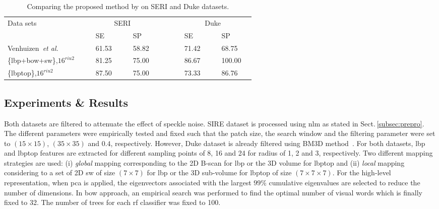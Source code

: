 \begin{tiny}
\begin{table}[t]
\caption{Comparing the proposed method by \cite{Venhuizen2015} on SERI and Duke datasets.}%
\centering
\begin{tabular}{lcclcclcccclcclc}
\toprule
Data sets 	& & &\multicolumn{4}{c}{SERI}& & & & &\multicolumn{4}{c}{Duke} & \\
  \cmidrule(l){2-8}  \cmidrule(l){10-16}
	         & & & SE & & & SP & & & & & SE & & & SP & \\
\midrule
Venhuizen~\textit{et al.} \cite{Venhuizen2015} 		& & & 61.53 & & & 58.82 & & & & & 71.42 & & & 68.75 & \\
\{\ac{lbp}+\ac{bow}+\ac{sw}\},$16^{riu2}$ 	& & & 81.25 & & & 75.00 & & & & & 86.67 & & & 100.00 &  \\
\{\ac{lbptop}\},$16^{riu2}$				& & & 87.50 & & & 75.00 & & & & & 73.33 & & & 86.76 &  \\


\bottomrule
\end{tabular}
\label{tab:ComparisonRefandOurs}
\end{table}

\end{tiny}

\subsection{Experiments \& Results}

Both datasets are filtered to attenuate the effect of speckle noise.
SIRE dataset is processed using \ac{nlm} as stated in Sect.\,\ref{subsec:prepro}.
The different parameters were empirically tested and fixed such that the patch size, the search window and the filtering parameter were set to $(15 \times 15)$, $(35 \times 35)$ and $0.4$, respectively.
However, Duke dataset is already filtered using BM3D method~\cite{Srinivasan2014}.
For both datasets, \ac{lbp} and \ac{lbptop} features are extracted for different sampling points of 8, 16 and 24 for radius of 1, 2 and 3, respectively.
Two different mapping strategies are used: (i) \emph{global} mapping corresponding to the 2D B-scan for \ac{lbp} or the 3D volume for \ac{lbptop} and (ii) \emph{local} mapping considering to a set of 2D \ac{sw} of size $(7 \times 7)$ for \ac{lbp} or the 3D sub-volume for \ac{lbptop} of size $(7 \times 7 \times 7)$.
For the high-level representation, when \ac{pca} is applied, the eigenvectors associated with the largest $99\%$ cumulative eigenvalues are selected to reduce the number of dimensions. In \ac{bow} approach, an empirical search was performed to find the optimal number of visual words which is finally fixed to 32.
The number of trees for each \ac{rf} classifier was fixed to 100.

